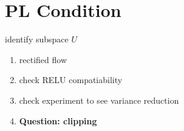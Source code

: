 \documentclass{article}
\theoremstyle{definition}
\theoremstyle{remark}
\theoremstyle{mystyle}
\newcommand{\1}{\mathbbm{1}}
\begin{document}
\newpage

\section{PL Condition}
identify subspace $U$

\begin{enumerate}
    \item rectified flow
    \item check RELU compatiability
    \item check experiment to see variance reduction
    \item \textbf{Question: clipping}
\end{enumerate}


\end{document}

